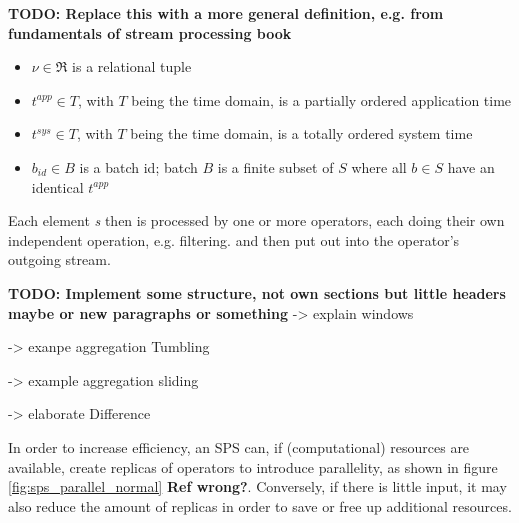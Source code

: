         \textbf{TODO: Replace this with a more general definition, e.g. from fundamentals of stream processing book}
        \begin{itemize}
        \item $\nu \in \mathfrak{R}$ is a relational tuple

        \item $t^{app} \in T$, with $T$ being the time domain, is a partially ordered application time
        
        \item $t^{sys} \in T$,  with $T$ being the time domain, is a totally ordered system time
        
        \item $b_{id} \in B$ is a batch id; batch $B$ is a finite subset of $S$ where all $b \in S$ have an identical $t^{app}$
        \end{itemize}

        Each element \textit{s} then is processed by one or more operators, each doing their own independent operation, e.g. filtering.
        and then put out into the operator's outgoing stream.

        \textbf{TODO: Implement some structure, not own sections but little headers maybe or new paragraphs or something}
        -> explain windows

        -> exanpe aggregation Tumbling

        -> example aggregation sliding

        -> elaborate Difference

        In order to increase efficiency, an SPS can, if (computational) resources are available, create replicas of operators to introduce parallelity, as shown in figure \ref{fig:sps_parallel_normal} \textbf{Ref wrong?}. 
        Conversely, if there is little input, it may also reduce the amount of replicas in order to save or free up additional resources.

        
        

